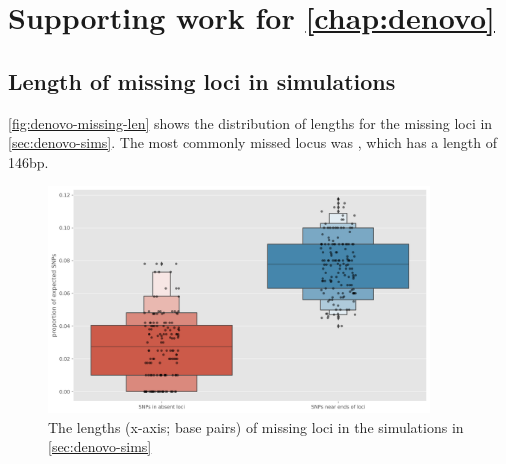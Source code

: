 \chapter{Supporting work for \autoref*{chap:denovo}}

\section{Length of missing loci in simulations}
\label{app:denovo-missing-lengths}

\autoref{fig:denovo-missing-len} shows the distribution of lengths for the missing loci in \autoref{sec:denovo-sims}. The most commonly missed locus was , which has a length of 146bp.

\begin{figure}
    \centering
    \includegraphics[width=0.9\textwidth]{Chapter1/Figs/denovo_errors.png}
    \caption{The lengths (x-axis; base pairs) of missing loci in the \denovo{} simulations in \autoref{sec:denovo-sims}}
    \label{fig:denovo-missing-len}
\end{figure}
